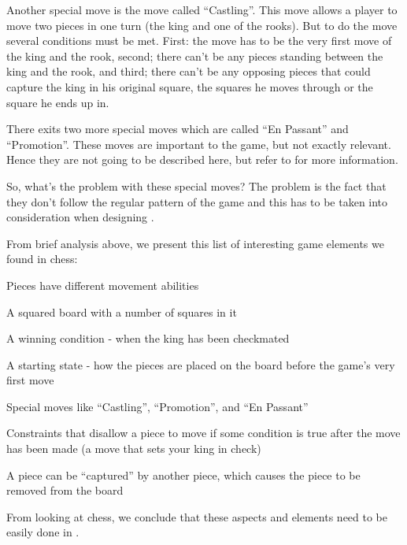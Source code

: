 Another special move is the move called ``Castling''. This move allows a player
to move two pieces in one turn (the king and one of the rooks). But to do the
move several conditions must be met. First: the move has to be the very first
move of the king and the rook, second; there can't be any pieces standing
between the king and the rook, and third; there can't be any opposing pieces
that could capture the king in his original square, the squares he moves through
or the square he ends up in.
\cite{chessrules} 

There exits two more special moves which are called ``En Passant'' and
``Promotion''. These moves are important to the game, but not exactly
relevant. Hence they are not going to be described here, but refer to
\cite{chessrules} for more information.

So, what's the problem with these special moves? The problem is the fact that
they don't follow the regular pattern of the game and this has to be taken into
consideration when designing \productname{}.


From brief analysis above, we present this list of interesting game elements we found 
in chess:

\begin{dlist}
\item Pieces have different movement abilities
\item A squared board with a number of squares in it
\item A winning condition - when the king has been checkmated
\item A starting state - how the pieces are placed on the board before the
  game's very first move
\item Special moves like ``Castling'', ``Promotion'', and ``En Passant''
\item Constraints that disallow a piece to move if some condition is true after
  the move has been made (a move that sets your king in check)
\item A piece can be ``captured'' by another piece, which causes the piece to be
  removed from the board
\end{dlist}

From looking at chess, we conclude that these aspects and elements need to be easily done in \productname{}.
